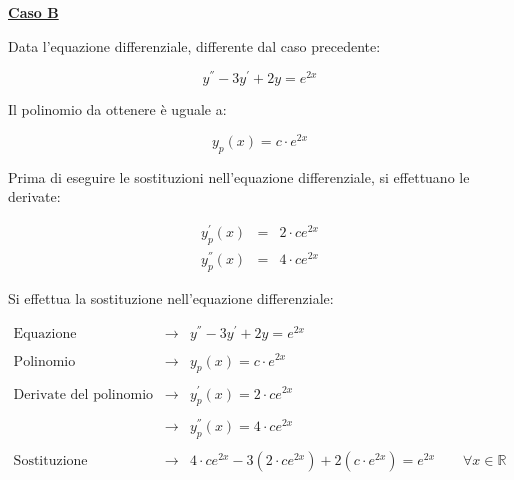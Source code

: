 \documentclass[a4paper]{article}
\begin{document}
	\newpage
	
	\begin{center}
		\large
		\textcolor{Green4}{\textbf{\underline{Caso B}}}
	\end{center}
	
	\noindent
	Data l'equazione differenziale, differente dal caso precedente:
	
	\begin{equation*}
		y^{''} - 3y^{'} + 2y = e^{2x}
	\end{equation*}
	
	\noindent
	Il polinomio da ottenere è uguale a:
	
	\begin{equation*}
		y_{p}\left(x\right) = c \cdot e^{2x}
	\end{equation*}
	
	\noindent
	Prima di eseguire le sostituzioni nell'equazione differenziale, si effettuano le derivate:
	
	\begin{equation*}
		\begin{array}{lll}
			y_{p}^{'}\left(x\right)	& = & 2 \cdot c e^{2x} \\
			y_{p}^{''}\left(x\right)& = & 4 \cdot c e^{2x}
		\end{array}
	\end{equation*}
	
	\noindent
	Si effettua la sostituzione nell'equazione differenziale:
	
	\begin{equation*}
		\begin{array}{lll}
			\text{Equazione differenziale}	& \longrightarrow & y^{''} - 3y^{'} +2y = e^{2x} \\
			&& \\
			\text{Polinomio}				& \longrightarrow & y_{p}\left(x\right) = c \cdot e^{2x} \\
			&& \\
			\text{Derivate del polinomio}	& \longrightarrow & y_{p}^{'}\left(x\right)	= 2 \cdot c e^{2x} \\
			&& \\
			& \longrightarrow & y_{p}^{''}\left(x\right) = 4 \cdot c e^{2x} \\
			&& \\
			\text{Sostituzione}				& \longrightarrow & 4 \cdot c e^{2x} - 3 \left(2 \cdot c e^{2x}\right) + 2 \left(c \cdot e^{2x}\right) = e^{2x} \hspace{2em} \forall x \in \mathbb{R}
		\end{array}
	\end{equation*}
	
\end{document}
